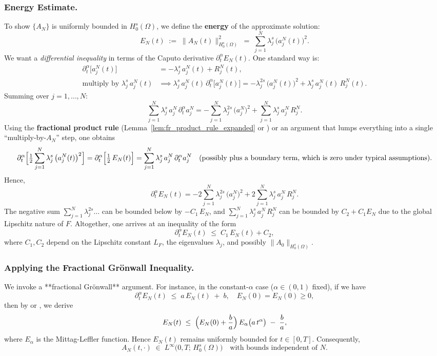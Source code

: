 \documentclass[12pt]{article}
\begin{document}
\subsubsection{Energy Estimate.}
\label{sec:energy_estimates}
To show \(\{A_N\}\) is uniformly bounded in \(H_0^s(\Omega)\), we define the
\textbf{energy} of the approximate solution:
\[
E_N(t)
\;:=\;
\|A_N(t)\|_{H_0^s(\Omega)}^2
\;=\;
\sum_{j=1}^N
  \lambda_j^s
  \,\bigl(a_j^N(t)\bigr)^2.
\]
We want a \emph{differential inequality} in terms of the Caputo derivative
\(\partial_t^\alpha E_N(t)\). One standard way is:
\[
\begin{aligned}
\partial_t^\alpha\bigl[a_j^N(t)\bigr]
&=
-\lambda_j^s\,a_j^N(t)
+ R_j^N(t),
\\[6pt]
\text{multiply by } \lambda_j^s\,a_j^N(t)
&\implies
\lambda_j^s\,a_j^N(t)\,\partial_t^\alpha \bigl[a_j^N(t)\bigr]
=
- \lambda_j^{2s}\,\bigl(a_j^N(t)\bigr)^2
+ \lambda_j^s\,a_j^N(t)\,R_j^N(t).
\end{aligned}
\]
Summing over \(j=1,\dots,N\):
\[
\sum_{j=1}^N
  \lambda_j^s\,a_j^N \,\partial_t^\alpha a_j^N
=
-\sum_{j=1}^N
  \lambda_j^{2s}\,\bigl(a_j^N\bigr)^2
+ \sum_{j=1}^N
  \lambda_j^s\,a_j^N\,R_j^N.
\]
Using the \textbf{fractional product rule} 
(Lemma~\ref{lem:fr_product_rule_expanded} or \cite[Thm.~2.2]{Diethelm2010}) or
an argument that lumps everything into a single “multiply-by-\(A_N\)” step, one obtains
\[
\partial_t^\alpha
  \Bigl[
    \tfrac12
    \sum_{j=1}^N
      \lambda_j^s
      \,\bigl(a_j^N(t)\bigr)^2
  \Bigr]
=
\partial_t^\alpha
  \Bigl[
    \tfrac12\,E_N(t)
  \Bigr]
=
\sum_{j=1}^N
  \lambda_j^s\,a_j^N\,\partial_t^\alpha a_j^N
\quad
\text{(possibly plus a boundary term, which is zero under typical assumptions).}
\]
Hence,
\[
\partial_t^\alpha E_N(t)
=
-2
\sum_{j=1}^N
   \lambda_j^{2s}\,\bigl(a_j^N\bigr)^2
+ 2
\sum_{j=1}^N
  \lambda_j^s\,a_j^N\,R_j^N.
\]
The negative sum \(\sum_{j=1}^N \lambda_j^{2s}\ldots\) can be bounded below by
\(-C_1\,E_N\), and \(\sum_{j=1}^N \lambda_j^s\,a_j^N\,R_j^N\) can be bounded by
\(C_2 + C_1E_N\) due to the global Lipschitz nature of \(F\). Altogether, one arrives at
an inequality of the form
\[
\partial_t^\alpha E_N(t)
\;\le\;
C_1\,E_N(t) + C_2,
\]
where \(C_1,C_2\) depend on the Lipschitz constant \(L_F\), the eigenvalues \(\lambda_j\),
and possibly \(\|A_0\|_{H_0^s(\Omega)}\).

\subsubsection{Applying the Fractional Grönwall Inequality.}
We invoke a **fractional Grönwall** argument. For instance, in the constant-\(\alpha\)
case (\(\alpha\in(0,1)\) fixed), if we have
\[
\partial_t^\alpha
  E_N(t)
\;\le\;
a\,E_N(t)
\;+\;
b,
\quad
E_N(0)=E_N(0)\ge0,
\]
then by \cite[Section~3.1]{Diethelm2010} or \cite{Ye2007}, we derive
\[
E_N(t)
\;\le\;
\Bigl(E_N(0) + \frac{b}{a}\Bigr)
\,E_\alpha\bigl(a\,t^\alpha\bigr)
\;-\;
\frac{b}{a},
\]
where \(E_\alpha\) is the Mittag-Leffler function.  Hence \(E_N(t)\) remains uniformly
bounded for \(t\in[0,T]\).  Consequently,
\[
A_N(t,\cdot)
\;\in\;
L^\infty\bigl(0,T;\,H_0^s(\Omega)\bigr)
\quad
\text{with bounds independent of }N.
\]
\end{document}
